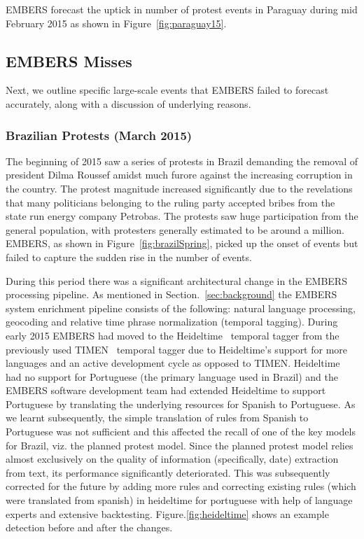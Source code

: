EMBERS forecast the uptick in number of protest events in Paraguay during mid
February 2015 as shown in Figure~\ref{fig:paraguay15}.

\subsection{EMBERS Misses}
Next, we outline specific large-scale events that
EMBERS failed to forecast accurately, along with a discussion of underlying
reasons.

\subsubsection{Brazilian Protests (March 2015)}
The beginning of 2015 saw a series of protests in Brazil demanding the
removal of president Dilma Roussef amidst much furore against the increasing corruption in the country.
The protest magnitude increased significantly due to the revelations that many politicians belonging
to the ruling party accepted bribes from the state run energy company Petrobas. The protests saw huge participation from
the general population, with protesters generally estimated to be around a
million. EMBERS, as shown in Figure~\ref{fig:brazilSpring},
picked up the onset of events but failed to capture the sudden rise in the number of events.

During this period there was a significant architectural change in the
EMBERS processing pipeline. As mentioned in Section.~\ref{sec:background} the
EMBERS system enrichment pipeline consists of the following: natural language processing,
geocoding and relative time phrase normalization (temporal tagging). During early 2015
EMBERS had moved to the Heideltime~\cite{heideltime} temporal
tagger from the previously used TIMEN~\cite{timen} temporal tagger due to
Heideltime's support for more languages and an active development cycle as
opposed to TIMEN.
Heideltime had no support for Portuguese (the primary
language used in Brazil) and the EMBERS software development team had extended Heideltime to
support Portuguese by translating the underlying
resources for Spanish to Portuguese. As we learnt subsequently,
the simple translation of rules from Spanish to Portuguese
was not sufficient and this affected the recall of one of the key models
for Brazil, viz. the planned protest model.
Since the planned protest model relies
almost exclusively on the quality of information (specifically, date) extraction from text,
its performance significantly deteriorated.
{\color{red} This was subsequently corrected for the future by adding
more rules and correcting existing rules (which were translated from
spanish) in heideltime for portuguese with help of language experts and
extensive backtesting. Figure.\ref{fig:heideltime} shows an example
detection before and after the changes}.

